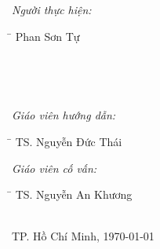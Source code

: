 \begin{titlepage}
\begin{minipage}[t]{0.5\textwidth}
\begin{flushleft} \large
\emph{Người thực hiện:}
\begin{tabbing}
\hspace{4cm}\= \kill
Phan Sơn Tự
\end{tabbing}
\end{flushleft}
\end{minipage}
~
\begin{minipage}{0.2\textwidth}
\end{minipage}
~
\begin{minipage}[t]{0.4\textwidth}
\begin{flushleft} \large
\emph{Giáo viên hướng dẫn:}\\
\begin{tabbing}
\hspace{4cm}\= \kill
TS. Nguyễn Đức Thái
\end{tabbing}
\emph{Giáo viên cố vấn:}\\
\begin{tabbing}
\hspace{4cm}\= \kill
TS. Nguyễn An Khương
\end{tabbing}
\end{flushleft}
\end{minipage}\\[1.75cm]



{\large TP. Hồ Chí Minh, \MakeLowercase{\today}}\\[2cm] %


 

\vfill %

\end{titlepage}

